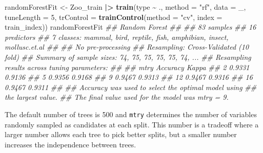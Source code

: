 \documentclass[
  notitlepage]{book}
\newenvironment{Shaded}{\begin{snugshade}}{\end{snugshade}}
\newcommand{\CommentTok}[1]{\textcolor[rgb]{0.56,0.35,0.01}{\textit{#1}}}
\newcommand{\DataTypeTok}[1]{\textcolor[rgb]{0.13,0.29,0.53}{#1}}
\newcommand{\DecValTok}[1]{\textcolor[rgb]{0.00,0.00,0.81}{#1}}
\newcommand{\ErrorTok}[1]{\textcolor[rgb]{0.64,0.00,0.00}{\textbf{#1}}}
\newcommand{\KeywordTok}[1]{\textcolor[rgb]{0.13,0.29,0.53}{\textbf{#1}}}
\newcommand{\NormalTok}[1]{#1}
\newcommand{\OperatorTok}[1]{\textcolor[rgb]{0.81,0.36,0.00}{\textbf{#1}}}
\newcommand{\StringTok}[1]{\textcolor[rgb]{0.31,0.60,0.02}{#1}}
\begin{document}
\begin{Shaded}
\begin{Highlighting}[]
\NormalTok{randomForestFit \textless{}{-}}\StringTok{ }\NormalTok{Zoo\_train }\OperatorTok{|}\ErrorTok{\textgreater{}}\StringTok{ }\KeywordTok{train}\NormalTok{(type }\OperatorTok{\textasciitilde{}}\StringTok{ }\NormalTok{.,}
  \DataTypeTok{method =} \StringTok{"rf"}\NormalTok{,}
  \DataTypeTok{data =}\NormalTok{ \_,}
    \DataTypeTok{tuneLength =} \DecValTok{5}\NormalTok{,}
    \DataTypeTok{trControl =} \KeywordTok{trainControl}\NormalTok{(}\DataTypeTok{method =} \StringTok{"cv"}\NormalTok{, }
                             \DataTypeTok{index =}\NormalTok{ train\_index))}
\NormalTok{randomForestFit}
\CommentTok{\#\# Random Forest }
\CommentTok{\#\# }
\CommentTok{\#\# 83 samples}
\CommentTok{\#\# 16 predictors}
\CommentTok{\#\#  7 classes: \textquotesingle{}mammal\textquotesingle{}, \textquotesingle{}bird\textquotesingle{}, \textquotesingle{}reptile\textquotesingle{}, \textquotesingle{}fish\textquotesingle{}, \textquotesingle{}amphibian\textquotesingle{}, \textquotesingle{}insect\textquotesingle{}, \textquotesingle{}mollusc.et.al\textquotesingle{} }
\CommentTok{\#\# }
\CommentTok{\#\# No pre{-}processing}
\CommentTok{\#\# Resampling: Cross{-}Validated (10 fold) }
\CommentTok{\#\# Summary of sample sizes: 74, 75, 75, 75, 75, 74, ... }
\CommentTok{\#\# Resampling results across tuning parameters:}
\CommentTok{\#\# }
\CommentTok{\#\#   mtry  Accuracy  Kappa }
\CommentTok{\#\#    2    0.9331    0.9136}
\CommentTok{\#\#    5    0.9356    0.9168}
\CommentTok{\#\#    9    0.9467    0.9313}
\CommentTok{\#\#   12    0.9467    0.9316}
\CommentTok{\#\#   16    0.9467    0.9311}
\CommentTok{\#\# }
\CommentTok{\#\# Accuracy was used to select the optimal model using}
\CommentTok{\#\#  the largest value.}
\CommentTok{\#\# The final value used for the model was mtry = 9.}
\end{Highlighting}
\end{Shaded}

The default number of trees is 500 and
\texttt{mtry} determines the number of variables randomly sampled as candidates
at each split. This number is a tradeoff where a larger number allows each tree
to pick better splits, but a smaller
number increases the independence between trees.
\end{document}
